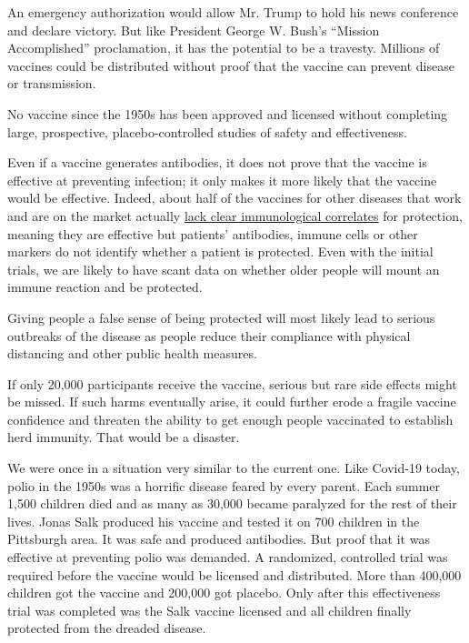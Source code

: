 An emergency authorization would allow Mr. Trump to hold his news
conference and declare victory. But like President George W. Bush's
``Mission Accomplished'' proclamation, it has the potential to be a
travesty. Millions of vaccines could be distributed without proof that
the vaccine can prevent disease or transmission.

No vaccine since the 1950s has been approved and licensed without
completing large, prospective, placebo-controlled studies of safety and
effectiveness.

Even if a vaccine generates antibodies, it does not prove that the
vaccine is effective at preventing infection; it only makes it more
likely that the vaccine would be effective. Indeed, about half of the
vaccines for other diseases that work and are on the market actually
\href{https://www.ncbi.nlm.nih.gov/pmc/articles/PMC2897268/\#:~:text=Although\%20the\%20immune\%20system\%20is,well\%20as\%20quantity\%2C\%20are\%20important.}{lack
clear immunological correlates} for protection, meaning they are
effective but patients' antibodies, immune cells or other markers do not
identify whether a patient is protected. Even with the initial trials,
we are likely to have scant data on whether older people will mount an
immune reaction and be protected.

Giving people a false sense of being protected will most likely lead to
serious outbreaks of the disease as people reduce their compliance with
physical distancing and other public health measures.

If only 20,000 participants receive the vaccine, serious but rare side
effects might be missed. If such harms eventually arise, it could
further erode a fragile vaccine confidence and threaten the ability to
get enough people vaccinated to establish herd immunity. That would be a
disaster.

We were once in a situation very similar to the current one. Like
Covid-19 today, polio in the 1950s was a horrific disease feared by
every parent. Each summer 1,500 children died and as many as 30,000
became paralyzed for the rest of their lives. Jonas Salk produced his
vaccine and tested it on 700 children in the Pittsburgh area. It was
safe and produced antibodies. But proof that it was effective at
preventing polio was demanded. A randomized, controlled trial was
required before the vaccine would be licensed and distributed. More than
400,000 children got the vaccine and 200,000 got placebo. Only after
this effectiveness trial was completed was the Salk vaccine licensed and
all children finally protected from the dreaded disease.

